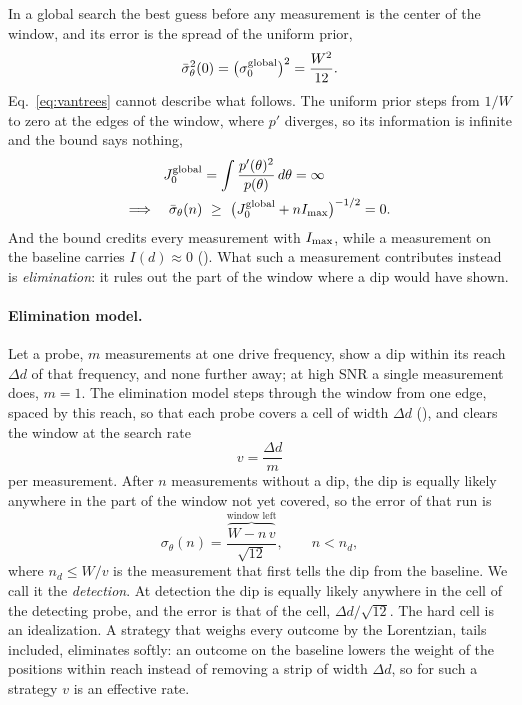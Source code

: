 In a global search the best guess before any measurement is the center of the window, and its error is the spread
of the uniform prior,
\begin{equation}
  \bar\sigma_\theta^2(0)=\big(\sigma_0^{\rm global}\big)^2=\frac{W^2}{12}.
  \label{eq:prior}
\end{equation}
Eq.~\eqref{eq:vantrees} cannot describe what follows. The uniform prior steps from $1/W$ to zero at the edges of the
window, where $p'$ diverges, so its information is infinite and the bound says nothing,
\begin{equation*}
  \begin{aligned}
  J_0^{\rm global}&=\int\frac{p'(\theta)^2}{p(\theta)}\,d\theta=\infty\\
  \Longrightarrow\quad\bar\sigma_\theta(n)&\ \ge\ \big(J_0^{\rm global}+nI_{\rm max}\big)^{-1/2}=0 .
  \end{aligned}
\end{equation*}
And the bound credits every measurement with $I_{\rm max}$, while a measurement on the baseline carries $I(d)\approx0$ ().
What such a measurement contributes instead is \emph{elimination}: it rules out the part of the window where a dip
would have shown.

\paragraph{Elimination model.} Let a probe, $m$ measurements at one drive frequency, show a dip within its reach
$\Delta d$ of that frequency, and none further away; at high SNR a single measurement does, $m=1$. The elimination
model steps through the window from one edge, spaced by this reach, so that each probe covers a cell of width
$\Delta d$ (), and clears the window at the search rate
\begin{equation}
  v=\frac{\Delta d}{m}
  \label{eq:search-rate}
\end{equation}
per measurement. After $n$ measurements without a dip, the dip is equally likely anywhere in the part of the window
not yet covered, so the error of that run is
\begin{equation}
  \sigma_\theta(n)=\frac{\overbrace{W-n\,v}^{\text{window left}}}{\sqrt{12}},\qquad n<n_d,
  \label{eq:elimination}
\end{equation}
where $n_d\le W/v$ is the measurement that first tells the dip from the baseline. We call it the \emph{detection}. At
detection the dip is equally likely anywhere in the cell of the detecting
probe, and the error is that of the cell, $\Delta d/\sqrt{12}$. The hard cell is an idealization. A strategy that
weighs every outcome by the Lorentzian, tails included, eliminates softly: an outcome on the baseline lowers the
weight of the positions within reach instead of removing a strip of width $\Delta d$, so for such a strategy $v$ is
an effective rate.

